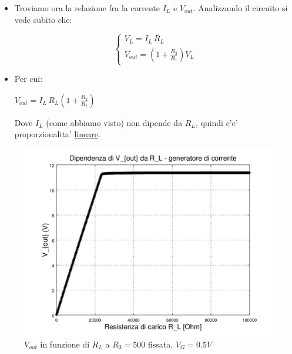 \documentclass{beamer}
\begin{document}
\begin{frame}
\begin{itemize}
\item Troviamo ora la relazione fra la corrente $I_L $ e $V_{out}$. Analizzando il circuito si vede subito che:

\begin{equation}
\begin{cases}
V_L = I_L \, R_L \\
V_{out} = (1+ \frac{R_2}{R_1})V_L
\end{cases}
\end{equation}

\item Per cui:

\begin{definition}
$V_{out} = I_L \, R_L (1+ \frac{R_2}{R_1})$
\end{definition}

Dove $I_L$ (come abbiamo visto) non dipende da $R_L$, quindi c'e' proporzionalita' \underline{lineare}.


\end{itemize}
\end{frame}


\begin{frame}

{
\centering

\begin{figure}
\centering
\includegraphics[width=0.7\linewidth]{./Vout_R_L_R3_500}
\caption{$V_{out}$ in funzione di $R_L$ a $R_3 = 500$ fissata, $V_G = 0.5V$}
\label{fig:Vout_R_L_R3_500}
\end{figure}

}
\end{frame}
\end{document}
